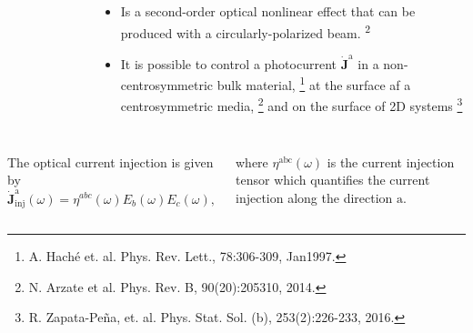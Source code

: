 \documentclass{beamer}
\begin{document}
\begin{frame}
{\begin{columns}
\begin{figure}[h!]
\begin{tikzpicture}
\end{tikzpicture}
\end{figure}



\begin{itemize}

\item 
Is a second-order optical nonlinear effect that can be produced with a
circularly-polarized beam.\textsuperscript{ 2}

\item 
It is possible to control a photocurrent $\mathbf{\dot{J}^{\mathrm{a}}}$ in a 
non-centrosymmetric bulk material,%
\footnote[frame]{\tiny A. Hach\'e et. al. Phys. Rev. Lett., 78:306-309, 
Jan1997.}
at the surface af a centrosymmetric media,%
\footnote[frame]{\tiny N. Arzate et al. Phys. Rev. B, 90(20):205310, 2014.}
and on the surface of 2D systems%
\footnote[frame]{\tiny R. Zapata-Pe\~na, et. al. Phys. Stat. Sol. (b), 
253(2):226-233, 2016.}

\end{itemize}

\end{columns}

\begin{columns}


The optical current injection is given by
\vspace{-1mm}
\begin{equation*}
\mathbf{\dot{J}}^{\mathrm{a}}_{\text{inj}}(\omega) =
\eta^{abc}(\omega)E_{b}(\omega)E_{c}(\omega), \label{eq:current}
\end{equation*}

\vspace{-2mm}
where $\eta^{\mathrm{abc}}(\omega)$ is the current injection tensor which 
quantifies the current injection along the direction $\mathrm{a}$.

\vspace{1mm}
\end{columns}

}

\end{frame}






\end{document}
